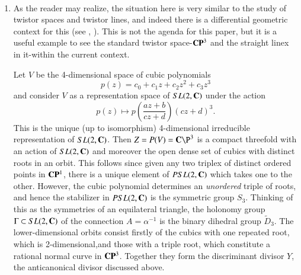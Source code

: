 \begin{example*}
~

\begin{enumerate}[]
\item As the reader may realize, the situation here is very similar to the study of twistor spaces and twistor lines, and indeed there is a differential geometric context for this (see \cite{chap7-key6}, \cite{chap7-key7}). This is not the agenda for this paper, but it is a useful example to see the standard twistor space-$\mathbf{C}\mathbf{P}^{3}$ and the straight linex in it-within the current context.

Let $V$ be the 4-dimensional space of cubic polynomials
$$
p(z)=c_{0} + c_{1}z +c_{2}z^{2} + c_{3}z^{3}
$$
and consider $V$ as a representation space of $SL(2, \mathbf{C})$ under the action
$$
p(z)\mapsto p \left( \dfrac{az + b}{cz + d}\right)(cz + d)^{3}.
$$
This is the unique (up to isomorphism) 4-dimensional irreducible representation of $SL(2, \mathbf{C})$. Then $Z= P(V) = \bC\P^{3}$ is a compact threefold with an action of $SL(2, \mathbf{C})$ and moreover the open dense set of cubics with distinct roots in an orbit. This follows since given any two triplex of distinct ordered points in $\mathbf{C}\mathbf{P}^{1}$, there is a unique element of $PSL(2, \mathbf{C})$ which takes one to the other. However, the cubic polynomial determines an \textit{unordered} triple of roots, and hence the stabilizer in $PSL(2, \mathbf{C})$ is the symmetric group $S_{3}$. Thinking of this as the symmetries of an equilateral triangle, the holonomy group $\Gamma \subset SL(2, \mathbf{C})$ of the connection $A= \alpha^{-1}$ is the binary dihedral group $\tilde{D}_{3}$. The lower-dimensional orbits consist firstly of the cubics with one repeated root, which is
2-dimensional,\pageoriginale and those with a triple root, which constitute a rational normal curve in $\mathbf{C}\mathbf{P}^{3}$. Together they form the discriminant divisor $Y$, the anticanonical divisor discussed above.


\end{enumerate}
\end{example*}
